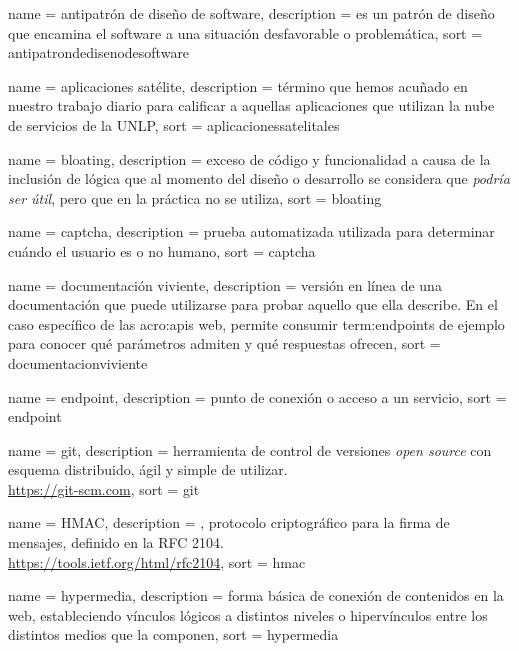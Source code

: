 \newpage
{} {
  name = {antipatrón de diseño de software},
  description = {es un patrón de diseño que encamina el software a una situación desfavorable o problemática},
  sort = {antipatrondedisenodesoftware}
}

 {
  name = {aplicaciones satélite},
  description = {término que hemos acuñado en nuestro trabajo diario para calificar a aquellas aplicaciones que utilizan la nube de servicios de la UNLP},
  sort = {aplicacionessatelitales}
}

 {
  name = {bloating},
  description = {exceso de código y funcionalidad a causa de la inclusión de lógica que al momento del diseño o desarrollo se considera que \textit{podría ser útil}, pero que en la práctica no se utiliza},
  sort = {bloating}
}

 {
  name = {captcha},
  description = {prueba automatizada utilizada para determinar cuándo el usuario es o no humano},
  sort = {captcha}
}

 {
  name = {documentación viviente},
  description = {versión en línea de una documentación que puede utilizarse para probar aquello que ella describe. En el caso específico de las \glspl{acro:api} web, permite consumir \glspl{term:endpoint} de ejemplo para conocer qué parámetros admiten y qué respuestas ofrecen},
  sort = {documentacionviviente}
}

 {
  name = {endpoint},
  description = {punto de conexión o acceso a un servicio},
  sort = {endpoint}
}

 {
  name = {git},
  description = {herramienta de control de versiones \textit{open source} con esquema distribuido, ágil y simple de utilizar.\\\url{https://git-scm.com}},
  sort = {git}
}

 {
  name = {HMAC},
  description = {, protocolo criptográfico para la firma de mensajes, definido en la RFC 2104.\\\url{https://tools.ietf.org/html/rfc2104}},
  sort = {hmac}
}

 {
  name = {hypermedia},
  description = {forma básica de conexión de contenidos en la web, estableciendo vínculos lógicos a distintos niveles o hipervínculos entre los distintos medios que la componen},
  sort = {hypermedia}
}

